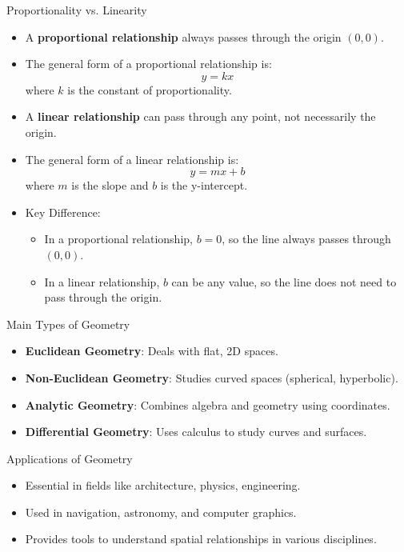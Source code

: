 \documentclass{beamer}
\begin{document}
\begin{frame}{Proportionality vs. Linearity}
    \begin{itemize}
        \item A \textbf{proportional relationship} always passes through the origin \((0, 0)\).
        \item The general form of a proportional relationship is:
        \[
        y = kx
        \]
        where \(k\) is the constant of proportionality.
        
        \item A \textbf{linear relationship} can pass through any point, not necessarily the origin.
        \item The general form of a linear relationship is:
        \[
        y = mx + b
        \]
        where \(m\) is the slope and \(b\) is the y-intercept.
        
        \item Key Difference:
        \begin{itemize}
            \item In a proportional relationship, \(b = 0\), so the line always passes through \((0, 0)\).
            \item In a linear relationship, \(b\) can be any value, so the line does not need to pass through the origin.
        \end{itemize}
    \end{itemize}
\end{frame}


\begin{frame}{Main Types of Geometry}
    \begin{itemize}
        \item \textbf{Euclidean Geometry}: Deals with flat, 2D spaces.
        \item \textbf{Non-Euclidean Geometry}: Studies curved spaces (spherical, hyperbolic).
        \item \textbf{Analytic Geometry}: Combines algebra and geometry using coordinates.
        \item \textbf{Differential Geometry}: Uses calculus to study curves and surfaces.
    \end{itemize}
\end{frame}

\begin{frame}{Applications of Geometry}
    \begin{itemize}
        \item Essential in fields like architecture, physics, engineering.
        \item Used in navigation, astronomy, and computer graphics.
        \item Provides tools to understand spatial relationships in various disciplines.
    \end{itemize}
\end{frame}
\end{document}
